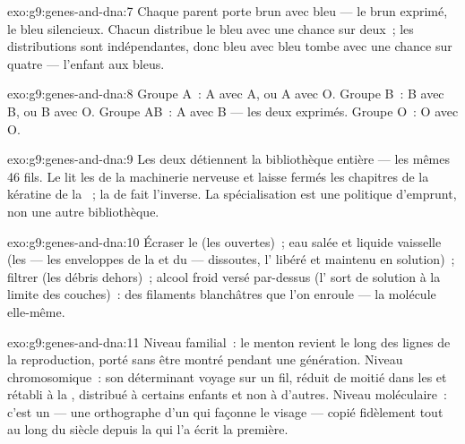 \begin{solution}{exo:g9:genes-and-dna:7}
Chaque parent porte brun avec bleu --- le brun exprimé, le
bleu silencieux. Chacun distribue le bleu avec une chance
sur deux~; les distributions sont indépendantes, donc bleu
avec bleu tombe avec une chance sur quatre --- l'enfant aux
 bleus.
\end{solution}

\begin{solution}{exo:g9:genes-and-dna:8}
Groupe A~: A avec A, ou A avec O. Groupe B~: B avec B, ou B
avec O. Groupe AB~: A avec B --- les deux exprimés. Groupe
O~: O avec O.
\end{solution}

\begin{solution}{exo:g9:genes-and-dna:9}
Les deux détiennent la bibliothèque entière --- les mêmes 46
fils. Le  lit les  de la machinerie nerveuse et
laisse fermés les chapitres de la kératine de la ~; la
 de  fait l'inverse. La spécialisation est une
politique d'emprunt, non une autre bibliothèque.
\end{solution}

\begin{solution}{exo:g9:genes-and-dna:10}
Écraser le  (les  ouvertes)~; eau salée et
liquide vaisselle (les  --- les enveloppes de la
 et du  --- dissoutes, l' libéré et maintenu
en solution)~; filtrer (les débris dehors)~; alcool froid
versé par-dessus (l' sort de solution à la limite des
couches)~: des filaments blanchâtres que l'on enroule --- la
molécule elle-même.
\end{solution}

\begin{solution}{exo:g9:genes-and-dna:11}
Niveau familial~: le menton revient le long des lignes de la
reproduction, porté sans être montré pendant une génération.
Niveau chromosomique~: son déterminant voyage sur un fil,
réduit de moitié dans les  et rétabli à la
, distribué à certains enfants et non à d'autres.
Niveau moléculaire~: c'est un  --- une orthographe
d'un  qui façonne le visage --- copié fidèlement tout au
long du siècle depuis la  qui l'a écrit la première.
\end{solution}


